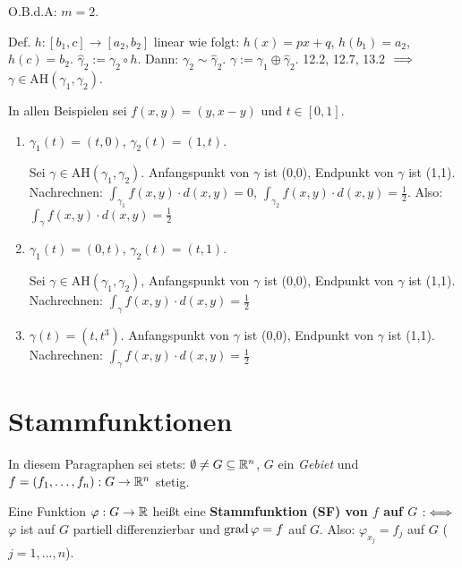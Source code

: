 \documentclass[a4paper,oneside,DIV15,BCOR12mm,chapterprefix=true,headings=onelinechapter]{scrbook}
\begin{document}
\begin{beweis}
O.B.d.A: $m=2$.

Def. $h:[b_1,c] \to [a_2,b_2]$ linear wie folgt: $h(x)=px+q$, $h(b_1)=a_2$, $h(c)=b_2$. $\hat\gamma_2 := \gamma_2\circ h$. Dann: $\gamma_2\sim \hat\gamma_2$. $\gamma := \gamma_1\oplus\hat\gamma_2$. 12.2, 12.7, 13.2 $\implies$ $\gamma\in \text{AH}(\gamma_1,\gamma_2)$.
\end{beweis}

\begin{beispiel}
In allen Beispielen sei $f(x,y)=(y,x-y)$ und $t\in[0,1]$.
\begin{enumerate}
\item $\gamma_1(t)=(t,0)$, $\gamma_2(t)=(1,t)$.

Sei $\gamma \in \text{AH}(\gamma_1,\gamma_2)$. Anfangspunkt von $\gamma$ ist (0,0), Endpunkt von $\gamma$ ist (1,1). Nachrechnen: $\int_{\gamma_1}f(x,y)\cdot d(x,y) = 0$, $\int_{\gamma_2}f(x,y)\cdot d(x,y) = \frac{1}{2}$. Also: $\int_\gamma f(x,y) \cdot d(x,y) = \frac{1}{2}$

\item $\gamma_1(t) = (0,t)$, $\gamma_2(t)=(t,1)$.

Sei $\gamma\in \text{AH}(\gamma_1,\gamma_2)$, Anfangspunkt von $\gamma$ ist (0,0), Endpunkt von $\gamma$ ist (1,1). Nachrechnen: $\int_{\gamma}f(x,y)\cdot d(x,y) = \frac{1}{2}$

\item $\gamma(t)=(t,t^3)$. Anfangspunkt von $\gamma$ ist (0,0), Endpunkt von $\gamma$ ist (1,1). Nachrechnen: $\int_\gamma f(x,y)\cdot d(x,y) = \frac{1}{2}$
\end{enumerate}
\end{beispiel}

\chapter{Stammfunktionen}

In diesem Paragraphen sei stets: $\emptyset \ne G \subseteq \mathbb{R}^n$, $G$ ein \emph{Gebiet} und $f=(f_1,\ldots,f_n): G\to\mathbb{R}^n$ stetig.

\begin{definition}
Eine Funktion $\varphi:G\to\mathbb{R}$ heißt eine \textbf{Stammfunktion (SF) von $f$ auf $G$} $:\iff$ $\varphi$ ist auf $G$ partiell differenzierbar und $\mathop{\rm grad}\nolimits\varphi = f$ auf $G$. Also: $\varphi_{x_j} = f_j$ auf $G$ ($j=1,\ldots,n$).
\end{definition}
\end{document}

